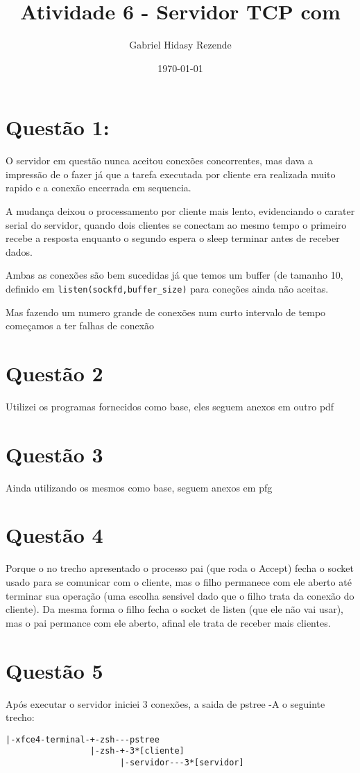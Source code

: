 \documentclass[11pt]{article}
\author{Gabriel Hidasy Rezende}
\date{\today}
\title{Atividade 6 - Servidor TCP com}
\begin{document}
\maketitle


\section{Questão 1:}
\label{sec-1}
O servidor em questão nunca aceitou conexões concorrentes, mas dava a
impressão de o fazer já que a tarefa executada por cliente era
realizada muito rapido e a conexão encerrada em sequencia. 

A mudança deixou o processamento por cliente mais lento, evidenciando
o carater serial do servidor, quando dois clientes se conectam ao
mesmo tempo o primeiro recebe a resposta enquanto o segundo espera o
sleep terminar antes de receber dados.

Ambas as conexões são bem sucedidas já que temos um buffer (de tamanho
10, definido em \texttt{listen(sockfd,buffer\_size)} para coneções ainda não
aceitas.

Mas fazendo um numero grande de conexões num curto intervalo de tempo
começamos a ter falhas de conexão

\section{Questão 2}
\label{sec-2}
Utilizei os programas fornecidos como base, eles seguem anexos em
outro pdf
\section{Questão 3}
\label{sec-3}
Ainda utilizando os mesmos como base, seguem anexos em pfg
\section{Questão 4}
\label{sec-4}
Porque o no trecho apresentado o processo pai (que roda o Accept)
fecha o socket usado para se comunicar com o cliente, mas o filho
permanece com ele aberto até terminar sua operação (uma escolha
sensivel dado que o filho trata da conexão do cliente). Da mesma
forma o filho fecha o socket de listen (que ele não vai usar), mas o
pai permance com ele aberto, afinal ele trata de receber mais
clientes.
\section{Questão 5}
\label{sec-5}
Após executar o servidor iniciei 3 conexões, a saida de pstree -A o
seguinte trecho:
\begin{verbatim}
|-xfce4-terminal-+-zsh---pstree
                 |-zsh-+-3*[cliente]
                       |-servidor---3*[servidor]

\end{verbatim}
\end{document}
